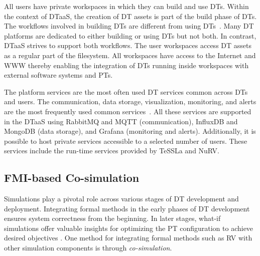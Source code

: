 All users have private workspaces in which they can build and use DTs.
Within the context of DTaaS, the creation of DT assets is part of the build phase of DTs.
The workflows involved in building DTs are different from using DTs~\cite{Prasad&21a}. Many DT platforms are dedicated to either building or using DTs but not both. In contrast, DTaaS strives to support both workflows.
The user workspaces access DT assets as a regular part of the filesystem.
All workspaces have access to the Internet and WWW thereby enabling the integration of DTs running inside workspaces with external software systems and PTs.

The platform services are the most often used DT services common across DTs and users. The communication, data storage, visualization, monitoring, and alerts are the most frequently used common services~\cite{qi2021enabling}.
All these services are supported in the DTaaS using RabbitMQ and MQTT (communication), InfluxDB and MongoDB (data storage), and Grafana (monitoring and alerts).
Additionally, it is possible to host private services accessible to a selected number of users. These services include the run-time services provided by TeSSLa and NuRV.


\subsection{FMI-based Co-simulation}
\label{sc:fmi}
Simulations play a pivotal role across various stages of DT development and deployment.
Integrating formal methods in the early phases of DT development ensures system correctness from the beginning.
In later stages, what-if simulations offer valuable insights for optimizing the PT configuration to achieve desired objectives \cite{Feng2021}.
One method for integrating formal methods such as RV with other simulation components is through \textit{co-simulation}.

